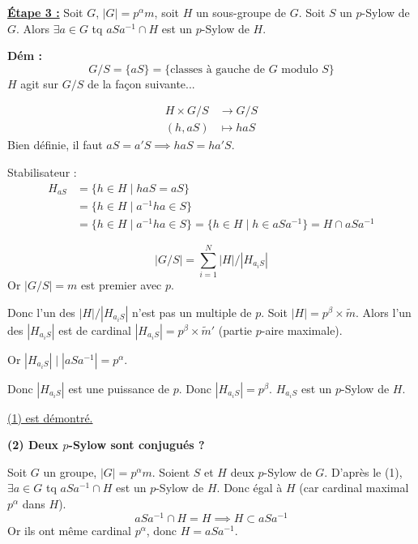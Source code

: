 \vspace{0.5cm}

\underline{\textbf{Étape 3 :}} Soit $G$, $|G| = p^\alpha m$, soit $H$ un sous-groupe de $G$.
Soit $S$ un $p$-Sylow de $G$.
Alors $\exists a \in G$ tq $a S a^{-1} \cap H$ est un $p$-Sylow de $H$.

\textbf{Dém :}
\[ G/S = \{ aS \} = \{ \text{classes à gauche de } G \text{ modulo } S \} \]
$H$ agit sur $G/S$ de la façon suivante...

\begin{align*}
    H \times G/S &\longrightarrow G/S \\
    (h, aS) &\longmapsto haS
\end{align*}
Bien définie, il faut $aS = a'S \implies haS = ha'S$.

Stabilisateur :
\begin{align*}
    H_{aS} &= \{ h \in H \mid haS = aS \} \\
           &= \{ h \in H \mid a^{-1}ha \in S \} \\
           &= \{ h \in H \mid a^{-1}ha \in S \} = \{ h \in H \mid h \in aSa^{-1} \} = H \cap aSa^{-1}
\end{align*}

\[ |G/S| = \sum_{i=1}^N |H|/|H_{a_iS}| \]
Or $|G/S| = m$ est premier avec $p$.

Donc l'un des $|H|/|H_{a_iS}|$ n'est pas un multiple de $p$.
Soit $|H| = p^\beta \times \tilde{m}$.
Alors l'un des $|H_{a_iS}|$ est de cardinal $|H_{a_iS}| = p^\beta \times \tilde{m}'$ (partie $p$-aire maximale).

Or $|H_{a_iS}| \mid |aSa^{-1}| = p^\alpha$.

Donc $|H_{a_iS}|$ est une puissance de $p$.
Donc $|H_{a_iS}| = p^\beta$. $H_{a_iS}$ est un $p$-Sylow de $H$.

\underline{(1) est démontré.} \hfill \faCheckSquare

\vspace{0.5cm}

\textbf{(2) Deux $p$-Sylow sont conjugués ?}

Soit $G$ un groupe, $|G| = p^\alpha m$.
Soient $S$ et $H$ deux $p$-Sylow de $G$.
D'après le (1), $\exists a \in G$ tq $aSa^{-1} \cap H$ est un $p$-Sylow de $H$.
Donc égal à $H$ (car cardinal maximal $p^\alpha$ dans $H$).
\[ aSa^{-1} \cap H = H \implies H \subset aSa^{-1} \]
Or ils ont même cardinal $p^\alpha$, donc $H = aSa^{-1}$. \hfill \faStop

